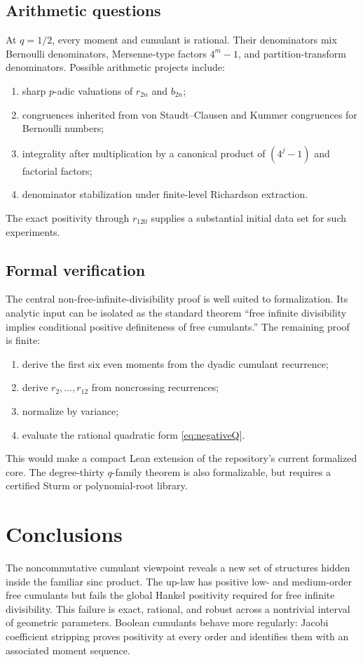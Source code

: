 \documentclass[11pt]{article}
\theoremstyle{definition}
\begin{document}
\subsection{Arithmetic questions}
At \(q=1/2\), every moment and cumulant is rational. Their denominators mix Bernoulli denominators, Mersenne-type factors \(4^m-1\), and partition-transform denominators. Possible arithmetic projects include:
\begin{enumerate}[label=(\roman*)]
\item sharp \(p\)-adic valuations of \(r_{2n}\) and \(b_{2n}\);
\item congruences inherited from von Staudt--Clausen and Kummer congruences for Bernoulli numbers;
\item integrality after multiplication by a canonical product of \((4^j-1)\) and factorial factors;
\item denominator stabilization under finite-level Richardson extraction.
\end{enumerate}
The exact positivity through \(r_{120}\) supplies a substantial initial data set for such experiments.

\subsection{Formal verification}
The central non-free-infinite-divisibility proof is well suited to formalization. Its analytic input can be isolated as the standard theorem ``free infinite divisibility implies conditional positive definiteness of free cumulants.'' The remaining proof is finite:
\begin{enumerate}[label=(\arabic*)]
\item derive the first six even moments from the dyadic cumulant recurrence;
\item derive \(r_2,\ldots,r_{12}\) from noncrossing recurrences;
\item normalize by variance;
\item evaluate the rational quadratic form \eqref{eq:negativeQ}.
\end{enumerate}
This would make a compact Lean extension of the repository's current formalized core. The degree-thirty \(q\)-family theorem is also formalizable, but requires a certified Sturm or polynomial-root library.

\section{Conclusions}
The noncommutative cumulant viewpoint reveals a new set of structures hidden inside the familiar sinc product. The up-law has positive low- and medium-order free cumulants but fails the global Hankel positivity required for free infinite divisibility. This failure is exact, rational, and robust across a nontrivial interval of geometric parameters. Boolean cumulants behave more regularly: Jacobi coefficient stripping proves positivity at every order and identifies them with an associated moment sequence.
\end{document}
